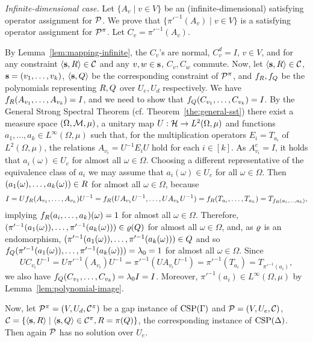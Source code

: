 \documentclass[11pt,letter]{article}
\begin{document}
{\it Infinite-dimensional case.}
Let $\{A_v\mid v\in V\}$ be an (infinite-dimensional) satisfying operator assignment for ${\mathcal P}$. We prove that $\{\pi'^{-1}(A_v)\mid v\in V\}$ is a satisfying operator assignment for ${\mathcal P}^\pi$. Let $C_v=\pi'^{-1}(A_v)$.

By Lemma~\ref{lem:mapping-infinite}, the $C_v$'s are normal, $C_v^d=I$, $v\in V$,
and for any constraint $\langle {\bf s},R \rangle\in{\mathcal C}$ and any $v,w\in{\bf s}$, $C_v,C_w$ commute.
Now, let $\langle {\bf s},R \rangle\in{\mathcal C}$, ${\bf s}=(v _1,\ldots, v _{k})$, $\langle {\bf s},Q \rangle$ be the
corresponding constraint of ${\mathcal P}^\pi$, and $f_R,f_Q$ be the polynomials representing $R,Q$ over $U_e,U_d$ respectively. We have $f_R(A_{v_1},\ldots, A_{v_k})=I$, and we need to show that $f_Q(C_{v_1},\ldots, C_{v_k})=I$. By the General Strong Spectral Theorem (cf. Theorem~\ref{the:general-sst}) there exist a measure space $(\Omega,{\mathcal M},\mu)$, a unitary map $U:{\mathcal H}\to L^2(\Omega,\mu)$ and functions $a_1,\dots,a_k\in L^\infty(\Omega,\mu)$ such that, for the multiplication operators $E_i = T_{a_i}$ of $L^2(\Omega,\mu)$, the relations $A_{v_i} = U^{-1} E_iU$ hold for each $i\in [k]$. As $A_{v_i}^e=I$, it holds that $a_i(\omega)\in U_e$ for almost all $\omega\in\Omega$. Choosing a different representative of the equivalence class of $a_i$ we may assume that $a_i(\omega)\in U_e$ for all $\omega\in\Omega$. Then $(a_1(\omega),\ldots, a_k(\omega))\in R$ for almost all $\omega\in\Omega$, because
\[
I=Uf_R(A_{v_1},\ldots, A_{v_k})U^{-1}=f_R(UA_{v_1}U^{-1},\ldots, UA_{v_k}U^{-1})= f_R(T_{a_i},\ldots, T_{a_k})=T_{f_R(a_i,\ldots, a_k)},
\]
implying $f_R(a_i,\ldots, a_k)(\omega)=1$ for almost all $\omega\in\Omega$. Therefore, $(\pi'^{-1}(a_1(\omega)),\ldots, \pi'^{-1}(a_k(\omega)))\in\varrho(Q)$ for almost all $\omega\in\Omega$, and, as $\varrho$ is an endomorphism, $(\pi'^{-1}(a_1(\omega)),\ldots, \pi'^{-1}(a_k(\omega)))\in Q$ and so $f_Q(\pi'^{-1}(a_1(\omega)),\ldots, \pi'^{-1}(a_k(\omega)))=\lambda_0=1$ for almost all $\omega\in\Omega$. Since 
\[
UC_{v_i}U^{-1}=U\pi'^{-1}(A_{v_i})U^{-1}=\pi'^{-1}(UA_{v_i}U^{-1})=\pi'^{-1}(T_{a_i})=T_{\pi'^{-1}(a_i)},
\]
we also have $f_Q(C_{v_1},\ldots, C_{v_k})=\lambda_0I=I$. Moreover, $\pi'^{-1}(a_i)\in L^\infty(\Omega,\mu)$ by Lemma~\ref{lem:polynomial-image}.

\smallskip

Now, let ${\mathcal P}^\pi=(V,U_d,{\mathcal C}^\pi)$ be a gap instance of ${\rm CSP}(\Gamma)$ and ${\mathcal P}=(V,U_e,{\mathcal C})$, ${\mathcal C}=\{\langle {\bf s},R \rangle\mid\langle {\bf s},Q \rangle\in{\mathcal C}^\pi,R=\pi(Q)\}$, the corresponding instance of ${\rm CSP}(\Delta)$. Then again ${\mathcal P}$ has no solution over $U_e$.
\end{document}
